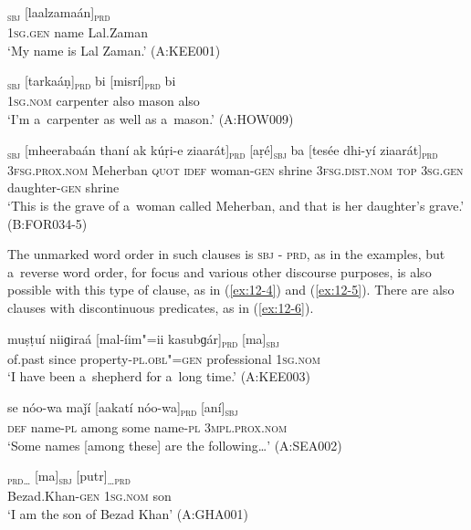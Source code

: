 \begin{exe}
\ex
\label{ex:12-1}
\textsubscript{\textsc{sbj}} [laalzamaán]\textsubscript{\textsc{prd}} \\
\textsc{1sg.gen} name Lal.Zaman  \\
\glt `My name is Lal Zaman.' (A:KEE001)
\end{exe}
\begin{exe}
\ex
\label{ex:12-2}
\gll [ma]\textsubscript{\textsc{sbj}} [tarkaáṇ]\textsubscript{\textsc{prd}} bi
     [misrí]\textsubscript{\textsc{prd}} bi \\
\textsc{1sg.nom} carpenter also mason also  \\
\glt `I'm a~carpenter as well as a~mason.' (A:HOW009)

\ex
\label{ex:12-3}
\gll [aní]\textsubscript{\textsc{sbj}} [mheerabaán thaní ak kúṛi-e ziaarát]\textsubscript{\textsc{prd}} [aṛé]\textsubscript{\textsc{sbj}} ba [tesée dhi-yí ziaarát]\textsubscript{\textsc{prd}} \\
\textsc{3fsg.prox.nom} Meherban \textsc{quot} \textsc{idef} woman-\textsc{gen}  shrine \textsc{3fsg.dist.nom} \textsc{top} \textsc{3sg.gen} daughter-\textsc{gen}  shrine \\
\glt `This is the grave of a~woman called Meherban, and that is her daughter's grave.' (B:FOR034-5)
\end{exe}

The unmarked word order in such clauses is \textsc{sbj - prd}, as in the examples, but a~reverse word order, for focus and various other discourse purposes, is also possible with this type of clause, as in (\ref{ex:12-4}) and (\ref{ex:12-5}). There are also clauses with discontinuous predicates, as in (\ref{ex:12-6}).

\begin{exe}
\ex
\label{ex:12-4}
\gll muṣṭuí niiɡiraá [mal-íim"=ii kasubɡár]\textsubscript{\textsc{prd}} [ma]\textsubscript{\textsc{sbj}} \\
of.past since property-\textsc{pl.obl"=gen} professional \textsc{1sg.nom}  \\
\glt `I have been a~shepherd for a~long time.' (A:KEE003)
\end{exe}
\begin{exe}
\ex
\label{ex:12-5}
\gll se nóo-wa maǰí [aakatí nóo-wa]\textsubscript{\textsc{prd}} [aní]\textsubscript{\textsc{sbj}} \\
\textsc{def} name-\textsc{pl} among some name-\textsc{pl} 3\textsc{mpl.prox.nom} \\
\glt `Some names [among these] are the following{\ldots}' (A:SEA002)
\end{exe}
\begin{exe}
\ex
\label{ex:12-6}
\gll [beezaadxaan-íi]\textsubscript{\textsc{prd{\ldots}}} [ma]\textsubscript{\textsc{sbj}} [putr]\textsubscript{\textsc{{\ldots}prd}} \\
Bezad.Khan-\textsc{gen} \textsc{1sg.nom} son  \\
\glt `I am the son of Bezad Khan' (A:GHA001)
\end{exe}

